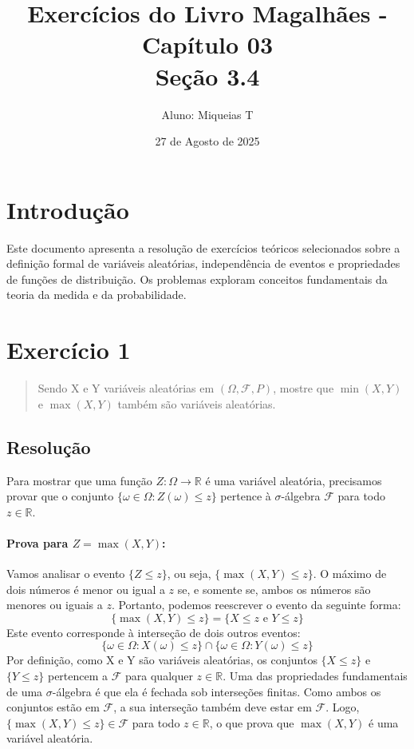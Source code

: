 \documentclass[12pt]{article}
\title{Exercícios do Livro Magalhães - Capítulo 03\\\large{Seção 3.4}}
\author{Aluno: Miqueias T}
\date{27 de Agosto de 2025}
\begin{document}
\maketitle

\section*{Introdução}
Este documento apresenta a resolução de exercícios teóricos selecionados sobre a definição formal de variáveis aleatórias, independência de eventos e propriedades de funções de distribuição. Os problemas exploram conceitos fundamentais da teoria da medida e da probabilidade.

\section{Exercício 1}

\begin{quote}
Sendo X e Y variáveis aleatórias em $(\Omega, \mathcal{F}, P)$, mostre que $\min(X,Y)$ e $\max(X,Y)$ também são variáveis aleatórias.
\end{quote}

\subsection*{Resolução}
Para mostrar que uma função $Z: \Omega \to \mathbb{R}$ é uma variável aleatória, precisamos provar que o conjunto $\{\omega \in \Omega : Z(\omega) \le z\}$ pertence à $\sigma$-álgebra $\mathcal{F}$ para todo $z \in \mathbb{R}$.

\paragraph{Prova para $Z = \max(X,Y)$:}
Vamos analisar o evento $\{Z \le z\}$, ou seja, $\{\max(X,Y) \le z\}$.
O máximo de dois números é menor ou igual a $z$ se, e somente se, ambos os números são menores ou iguais a $z$. Portanto, podemos reescrever o evento da seguinte forma:
\[ \{\max(X,Y) \le z\} = \{X \le z \text{ e } Y \le z\} \]
Este evento corresponde à interseção de dois outros eventos:
\[ \{\omega \in \Omega : X(\omega) \le z\} \cap \{\omega \in \Omega : Y(\omega) \le z\} \]
Por definição, como X e Y são variáveis aleatórias, os conjuntos $\{X \le z\}$ e $\{Y \le z\}$ pertencem a $\mathcal{F}$ para qualquer $z \in \mathbb{R}$.
Uma das propriedades fundamentais de uma $\sigma$-álgebra é que ela é fechada sob interseções finitas. Como ambos os conjuntos estão em $\mathcal{F}$, a sua interseção também deve estar em $\mathcal{F}$.
Logo, $\{\max(X,Y) \le z\} \in \mathcal{F}$ para todo $z \in \mathbb{R}$, o que prova que $\max(X,Y)$ é uma variável aleatória.
\end{document}
